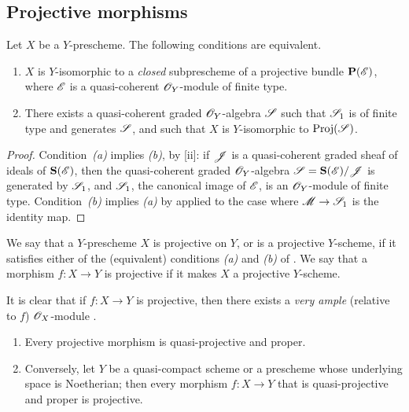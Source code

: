 \subsection{Projective morphisms}
\label{subsection:projective-morphisms}

\begin{prop}[5.5.1]
\label{2.5.5.1}
Let $X$ be a $Y$-prescheme.
The following conditions are equivalent.
\begin{enumerate}[label=\emph{(\alph*)}]
    \item $X$ is $Y$-isomorphic to a \emph{closed} subprescheme of a projective bundle $\mathbf{P}(\mathscr{E})$, where $\mathscr{E}$ is a quasi-coherent $\mathscr{O}_Y$-module of finite type.
    \item There exists a quasi-coherent graded $\mathscr{O}_Y$-algebra $\mathscr{S}$ such that $\mathscr{S}_1$ is of finite type and generates $\mathscr{S}$, and such that $X$ is $Y$-isomorphic to ${\mathop{\mathrm{Proj}}\nolimits}(\mathscr{S})$.
\end{enumerate}
\end{prop}

\begin{proof}
\label{proof-2.5.5.1}
Condition~\emph{(a)} implies \emph{(b)}, by [ii]:
if $\mathscr{J}$ is a quasi-coherent graded sheaf of ideals of $\mathbf{S}(\mathscr{E})$, then the quasi-coherent graded $\mathscr{O}_Y$-algebra $\mathscr{S}=\mathbf{S}(\mathscr{E})/\mathscr{J}$ is generated by $\mathscr{S}_1$, and $\mathscr{S}_1$, the canonical image of $\mathscr{E}$, is an $\mathscr{O}_Y$-module of finite type.
Condition~\emph{(b)} implies \emph{(a)} by  applied to the case where $\sh{M}\to\sh{S}_1$ is the identity map.
\end{proof}

\begin{defn}[5.5.2]
\label{2.5.5.2}
We say that a $Y$-prescheme $X$ is projective on $Y$, or is a projective $Y$-scheme, if it satisfies either of the (equivalent) conditions \emph{(a)} and \emph{(b)} of .
We say that a morphism $f:X\to Y$ is projective if it makes $X$ a projective $Y$-scheme.
\end{defn}

It is clear that if $f:X\to Y$ is projective, then there exists a \emph{very ample} (relative to $f$) $\mathscr{O}_X$-module .

\begin{thm}[5.5.3]
\label{2.5.5.3}
\medskip\noindent
\begin{enumerate}[label=\emph{(\roman*)}]
    \item Every projective morphism is quasi-projective and proper.
    \item Conversely, let $Y$ be a quasi-compact scheme or a prescheme whose underlying space is Noetherian;
        then every morphism $f:X\to Y$ that is quasi-projective and proper is projective.
\end{enumerate}
\end{thm}

